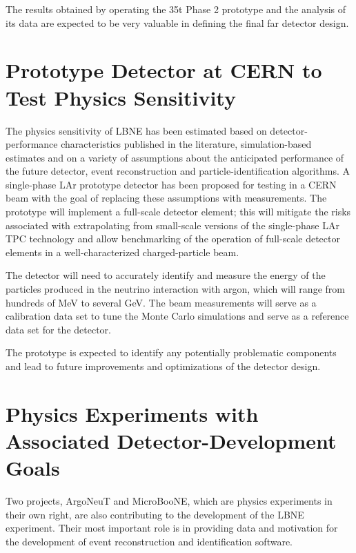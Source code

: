 The results obtained by operating the 35t Phase 2 prototype and the analysis of its data are expected
to be very valuable in defining the final far detector design. 

\section{Prototype Detector at CERN to Test Physics Sensitivity}

The physics sensitivity of LBNE  has been estimated based on detector-performance characteristics published in the literature, simulation-based estimates
and on a variety of assumptions about the anticipated performance of the future detector, event reconstruction and particle-identification algorithms.
A single-phase LAr prototype detector has been proposed for testing in a CERN beam with the goal of
 replacing these assumptions with measurements.  The prototype will implement a full-scale detector element; this will 
 mitigate the risks associated with extrapolating from small-scale versions of the single-phase LAr TPC technology and allow benchmarking of the operation of full-scale detector elements in a well-characterized charged-particle beam.  

The detector will need to accurately identify and measure the energy of the particles produced in the neutrino interaction with argon, which will range from hundreds of MeV to several GeV.
The beam measurements will serve as a calibration data set to tune the Monte Carlo simulations and serve as a reference data set for the detector. 

The prototype is expected to identify any potentially problematic components and lead to future improvements and optimizations of the detector design.


\section{Physics Experiments with Associated Detector-Development Goals}

Two projects, ArgoNeuT and MicroBooNE,  which are physics experiments in their own right, are also contributing to the development of the LBNE experiment. Their most important role is in providing data and motivation for the development of event reconstruction and identification software.

